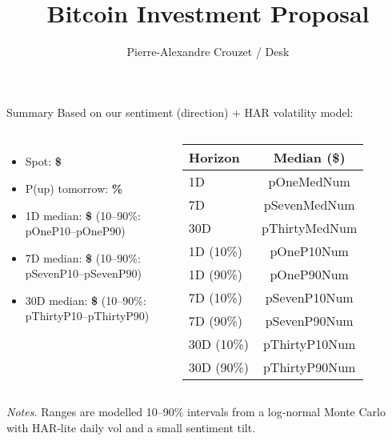 \documentclass[11pt]{beamer}
\title{Bitcoin Investment Proposal}
\author{Pierre-Alexandre Crouzet / Desk}
\date{\reportDate}
\begin{document}
\begin{frame}[plain]
  \titlepage
\end{frame}

\begin{frame}{Summary}
  Based on our sentiment (direction) + HAR volatility model:

  \vspace{2mm}
  \begin{columns}[T,onlytextwidth]
      \begin{itemize}
        \item Spot: \textbf{\$ \spotUSD}
        \item P(up) tomorrow: \textbf{\probUpOneDay\%}
        \item 1D median: \textbf{\$ \pOneMed} (10--90\%: \csname pOneP10\endcsname--\csname pOneP90\endcsname)
        \item 7D median: \textbf{\$ \pSevenMed} (10--90\%: \csname pSevenP10\endcsname--\csname pSevenP90\endcsname)
        \item 30D median: \textbf{\$ \pThirtyMed} (10--90\%: \csname pThirtyP10\endcsname--\csname pThirtyP90\endcsname)
      \end{itemize}

      {\small
      \begin{tabular}{@{}lS@{}}
        \toprule
        \textbf{Horizon} & {\textbf{Median (\$)}} \\
        \midrule
        1D  & {\csname pOneMedNum\endcsname} \\
        7D  & {\csname pSevenMedNum\endcsname} \\
        30D & {\csname pThirtyMedNum\endcsname} \\
        \midrule
        1D (10\%)  & {\csname pOneP10Num\endcsname} \\
        1D (90\%)  & {\csname pOneP90Num\endcsname} \\
        7D (10\%)  & {\csname pSevenP10Num\endcsname} \\
        7D (90\%)  & {\csname pSevenP90Num\endcsname} \\
        30D (10\%) & {\csname pThirtyP10Num\endcsname} \\
        30D (90\%) & {\csname pThirtyP90Num\endcsname} \\
        \bottomrule
      \end{tabular}
      }
  \end{columns}

  \vspace{2mm}
  {\scriptsize \textit{Notes.} Ranges are modelled 10--90\% intervals from a log‑normal
  Monte Carlo with HAR‑lite daily vol and a small sentiment tilt.}
\end{frame}
\end{document}
